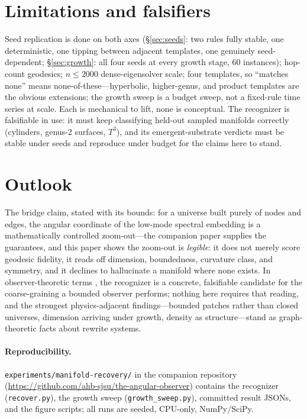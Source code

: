 \documentclass[11pt]{article}
\begin{document}
\section{Limitations and falsifiers}\label{sec:limits}
Seed replication is done on both axes (\S\ref{sec:seeds}: two rules fully
stable, one deterministic, one tipping between adjacent templates, one
genuinely seed-dependent; \S\ref{sec:growth}: all four seeds at every growth
stage, $60$ instances); hop-count geodesics; $n\le2000$ dense-eigensolver
scale; four
templates, so ``matches none'' means none-of-these---hyperbolic, higher-genus,
and product templates are the obvious extensions; the growth sweep is a
budget sweep, not a fixed-rule time series at scale. Each is mechanical to
lift, none is conceptual. The recognizer is falsifiable in use: it must keep
classifying held-out sampled manifolds correctly (cylinders, genus-2
surfaces, $T^3$), and its emergent-substrate verdicts must be stable under
seeds and reproduce under budget for the claims here to stand.

\section{Outlook}\label{sec:disc}
The bridge claim, stated with its bounds: for a universe built purely of
nodes and edges, the angular coordinate of the low-mode spectral embedding is
a mathematically controlled zoom-out---the companion paper supplies the
guarantees, and this paper shows the zoom-out is \emph{legible}: it does not
merely score geodesic fidelity, it reads off dimension, boundedness,
curvature class, and symmetry, and it declines to hallucinate a manifold
where none exists. In observer-theoretic terms \cite{wolfram2026}, the
recognizer is a concrete, falsifiable candidate for the coarse-graining a
bounded observer performs; nothing here requires that reading, and the
strongest physics-adjacent findings---bounded patches rather than closed
universes, dimension arriving under growth, density as structure---stand as
graph-theoretic facts about rewrite systems.

\paragraph{Reproducibility.} \texttt{experiments/manifold-recovery/} in the
companion repository
(\url{https://github.com/ahb-sjsu/the-angular-observer}) contains the
recognizer (\texttt{recover.py}), the growth sweep
(\texttt{growth\_sweep.py}), committed result JSONs, and the figure scripts;
all runs are seeded, CPU-only, NumPy/SciPy.
\end{document}
